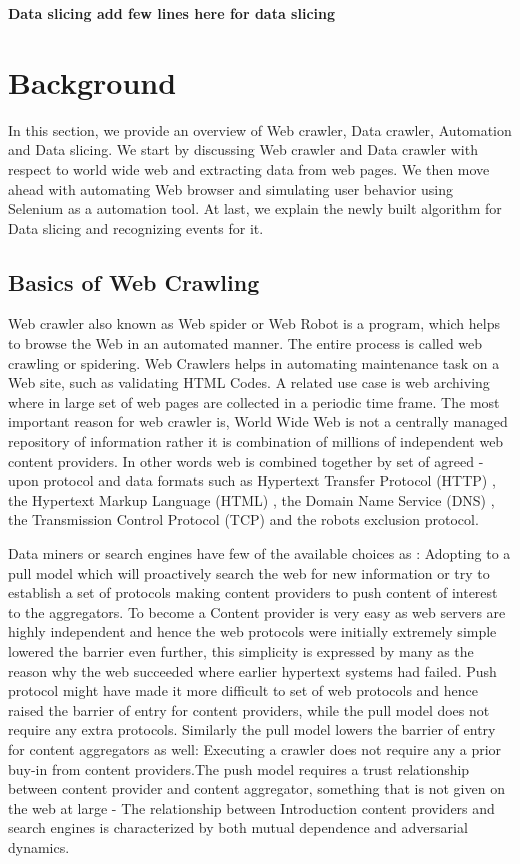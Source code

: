 \documentclass[article,type=msc,colorback,accentcolor=tud9c,twoside,11pt]{tudthesis}
\begin{document}
\textbf{Data slicing add few lines here for data slicing}

\clearpage
\section{Background}
In this section, we provide an overview of Web crawler, Data crawler, Automation and Data slicing. We start by discussing Web crawler and Data crawler with respect to world wide web and extracting data from web pages. We then move ahead with automating Web browser and simulating user behavior using Selenium as a automation tool. At last, we explain the newly built algorithm for Data slicing and recognizing events for it.

\subsection{Basics of Web Crawling}

Web crawler\cite{WebCrawlerAReview} also known as Web spider or Web Robot is a program, which helps to browse the Web in an automated manner. The entire process is called web crawling or spidering. Web Crawlers helps in automating maintenance task on a Web site, such as validating HTML Codes. A related use case is web archiving where in large set of web pages are collected in a periodic time frame. The most important reason for web crawler is, World Wide Web is not a centrally managed repository of information rather it is combination of millions of independent web content providers. In other words web is combined together by set of agreed - upon protocol and data formats such as Hypertext Transfer Protocol (HTTP) , the Hypertext Markup Language (HTML) , the Domain Name Service (DNS) , the Transmission Control Protocol (TCP) and the robots exclusion protocol. 

Data miners or search engines have few of the available choices as : Adopting to a pull model which will proactively search the web for new information or try to establish a set of protocols making content providers to push content of interest to the aggregators. To become a Content provider is very easy as web servers are highly independent and hence the web protocols were initially extremely simple lowered the barrier even further, this simplicity is expressed by many as the reason why the web succeeded where earlier hypertext systems had failed. Push protocol might have made it more difficult to set of web protocols and hence raised the barrier of entry for content providers, while the pull model does not require any extra protocols. Similarly the pull model lowers the barrier of entry for content aggregators as well: Executing a crawler does not require any a prior buy-in from content providers.The push model requires a trust relationship between content provider and content aggregator, something that is not given on the web at large - The relationship between Introduction content providers and search engines is characterized by both mutual dependence and adversarial dynamics.
\end{document}
